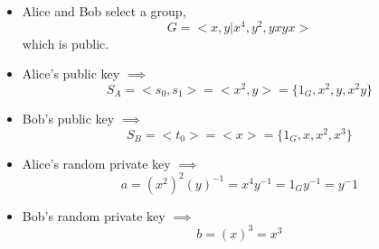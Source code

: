 \documentclass[12pt]{article}
\begin{document}
     \begin{itemize}
          \item Alice and Bob select a group,\\
          $$G=<x,y|x^4,y^2,yxyx>$$
          which is public.
          \item Alice's public key $\implies$\\
          $$S_A=<s_0,s_1>=<x^2,y>=\{1_G,x^2,y,x^2y\}$$
          \item Bob's public key $\implies$\\
          $$S_B=<t_0>=<x>=\{1_G,x,x^2,x^3\}$$
        \end{itemize}
        \begin{itemize}
         \item Alice's random private key $\implies$\\
         $$a=(x^2)^2(y)^{-1}=x^4y^{-1}=1_Gy^{-1}=y^-1$$
         \item Bob's random private key $\implies$\\
         $$b=(x)^3=x^3$$
       \end{itemize}
       
\end{document}
